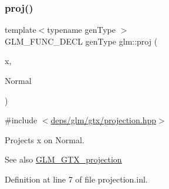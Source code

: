 \subsubsection{\texorpdfstring{proj()}{proj()}}
{\footnotesize\ttfamily template$<$typename gen\+Type $>$ \\
G\+L\+M\+\_\+\+F\+U\+N\+C\+\_\+\+D\+E\+CL gen\+Type glm\+::proj (\begin{DoxyParamCaption}\item[{gen\+Type const \&}]{x,  }\item[{gen\+Type const \&}]{Normal }\end{DoxyParamCaption})}



{\ttfamily \#include $<$\hyperlink{projection_8hpp}{deps/glm/gtx/projection.\+hpp}$>$}

Projects x on Normal.

\begin{DoxySeeAlso}{See also}
\hyperlink{group__gtx__projection}{G\+L\+M\+\_\+\+G\+T\+X\+\_\+projection} 
\end{DoxySeeAlso}


Definition at line 7 of file projection.\+inl.

